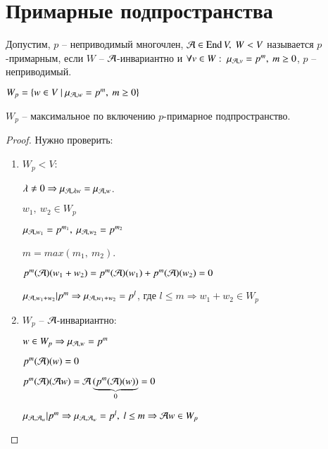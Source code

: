 \documentclass[main]{subfiles}
\begin{document}
\chapter{Примарные подпространства}

\begin{definition} 
    Допустим, $p$ -- неприводимый многочлен, $\mca \in \End V, \ W < V$ называется $p$-примарным, если $W$ -- $\mathcal{A}$-инвариантно
    и $\forall v \in W: \ \mu_{\mathcal{A}, v} = p^m, \ m \geq 0$, $p$ -- неприводимый.

    \begin{center}$W_p = \{w \in V \ | \ \mu_{\mathcal{A}, w} = p^m, \ m \geq 0\}$ \end{center}
\end{definition}

\begin{proposition}
    $W_p$ -- максимальное по включению $p$-примарное подпространство.
\end{proposition}

\begin{proof}
    Нужно проверить:
    \begin{enumerate}
        \item $W_p < V$:
              \begin{center}
                  $\lambda \neq 0 \Rightarrow \mu_{\mathcal{A}, \lambda w} = \mu_{\mathcal{A}, w}$.

                  $w_1, \ w_2 \in W_p$

                  $\mu_{\mathcal{A}, w_1} = p^{m_1}, \ \mu_{\mathcal{A}, w_2} = p^{m_2}$

                  $ m = max(m_1, \ m_2)$.

                  $p^m(\mathcal{A})(w_1+w_2) = p^m(\mathcal{A})(w_1)+ p^m(\mathcal{A})(w_2) = 0 $

                  $\mu_{\mathcal{A}, w_1 +w_2} | p^m \Rightarrow \mu_{\mathcal{A}, w_1 +w_2} = p^l$, где $l \leq m \Rightarrow w_1+w_2 \in W_p$
              \end{center}

        \item $W_p$ -- $\mathcal{A}$-инвариантно:
              \begin{center}
                  $w \in W_p \Rightarrow \mu_{\mathcal{A}, w} = p^m$

                  $p^m(\mathcal{A})(w) = 0$

                  $p^m(\mathcal{A})(\mathcal{A} w) = \mathcal{A}\underbrace{(p^m(\mathcal{A})(w))}_{0} = 0 $

                  $ \mu_{\mathcal{A}, \mathcal{A}_w} | p^m \Rightarrow \mu_{\mathcal{A}, \mathcal{A}_w} = p^l, \ l \leq m \Rightarrow \mathcal{A} w \in W_p$
              \end{center}

    \end{enumerate}
\end{proof}
\end{document}
